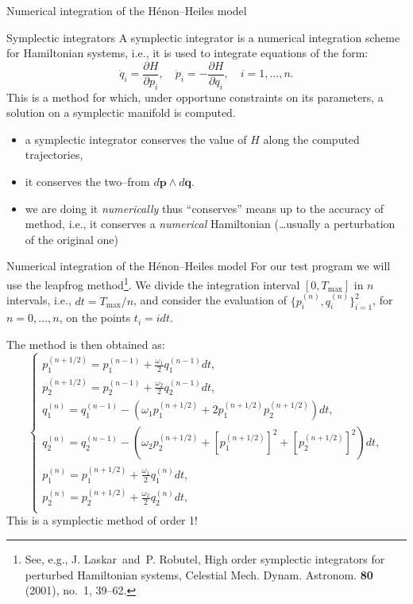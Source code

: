 \documentclass[xcolor={svgnames,usenames}]{beamer}
\begin{document}
\begin{frame}{Numerical integration of the H\'enon--Heiles model}

\begin{block}{Symplectic integrators}
A symplectic integrator is a numerical integration scheme for Hamiltonian systems, i.e., it is used to integrate equations of the form:
\begin{equation*}
	\dot{q}_i = \frac{\partial H}{\partial p_i}, \quad \dot{p}_i = -\frac{\partial H}{\partial q_i}, \quad i=1,\ldots,n.
\end{equation*}
This is a method for which, under opportune constraints on its parameters, a solution on a symplectic manifold is computed. 
\end{block}

\begin{itemize}
	\item<2-> a symplectic integrator conserves the value of $H$ along the computed trajectories,
	\item<3-> it conserves the two--from $d\mathbf{p} \wedge d\mathbf{q}$.
	\item<4-> we are doing it \emph{numerically} thus ``conserves'' means up to the accuracy of method, i.e., it conserves a \emph{numerical} Hamiltonian (\ldots usually a perturbation of the original one)
\end{itemize}

\end{frame}

\begin{frame}{Numerical integration of the H\'enon--Heiles model}
For our test program we will use the \alert{leapfrog method}\footnote{\scriptsize See, e.g., J. Laskar\ and\ P. Robutel, High order symplectic integrators for perturbed Hamiltonian systems, Celestial Mech. Dynam. Astronom. {\bf 80} (2001), no.~1, 39--62.}. We divide the integration interval $[0,T_{\text{max}}]$ in $n$ intervals, i.e., $dt = T_{\text{max}}/n$, and consider the evaluation of $\{p_i^{(n)},q_i^{(n)}\}_{i=1}^{2}$, for $n=0,\ldots,n$, on the points $t_i = i dt$.

The method is then obtained as:
\begin{equation*}
	\begin{cases}
	p^{(n+1/2)}_1 = p^{(n-1)}_1 + \frac{\omega_1}{2} q_1^{(n-1)} dt,\\
	p^{(n+1/2)}_2 = p^{(n-1)}_2 + \frac{\omega_2}{2} q_2^{(n-1)} dt,\\
	q^{(n)}_1 = q^{(n-1)}_1 - (\omega_1 p_1^{(n+1/2)} + 2 p_1^{(n+1/2)} p_2^{(n+1/2)} ) dt,\\
	q^{(n)}_2 = q^{(n-1)}_2 - (\omega_2 p_2^{(n+1/2)} + [p_1^{(n+1/2)}]^2 + [p_2^{(n+1/2)}]^2 ) dt,\\
	p^{(n)}_1 = p^{(n+1/2)}_1 + \frac{\omega_1}{2} q_1^{(n)} dt,\\
	p^{(n)}_2 = p^{(n+1/2)}_2 + \frac{\omega_2}{2} q_2^{(n)} dt,\\	  
	\end{cases}
\end{equation*}
This is a symplectic method of order 1!
\end{frame}
\end{document}
